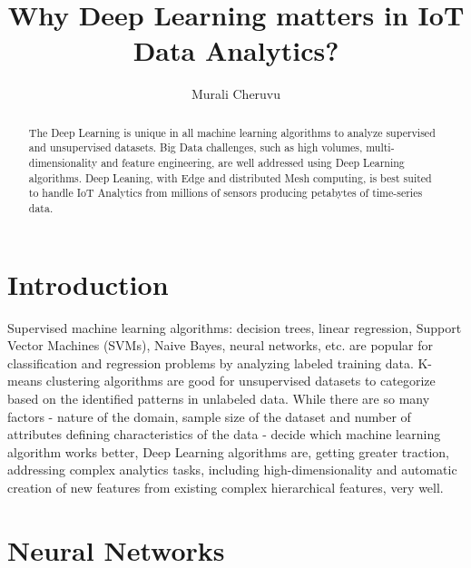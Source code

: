 \documentclass[sigconf]{acmart}
\begin{document}
	\title{Why Deep Learning matters in IoT Data Analytics?}
	
	
	\author{Murali Cheruvu}
	
	\renewcommand{\shortauthors}{M. Cheruvu}
	
	
	\begin{abstract}
		
	The Deep Learning is unique in all machine learning algorithms to analyze supervised and unsupervised datasets. Big Data challenges, such as high volumes, multi-dimensionality and feature engineering, are well addressed using Deep Learning algorithms. Deep Leaning, with Edge and distributed Mesh computing, is best suited to handle IoT Analytics from millions of sensors producing petabytes of time-series data.
			
	\end{abstract}
	
	
	\maketitle

	
	\section{Introduction}		

	Supervised machine learning algorithms: decision trees, linear regression, Support Vector Machines (SVMs), Naive Bayes, neural networks, etc. are popular for classification and regression problems by analyzing labeled training data. K-means clustering algorithms are good for unsupervised datasets to categorize based on the identified patterns in unlabeled data. While there are so many factors - nature of the domain, sample size of the dataset and number of attributes defining characteristics of the data - decide which machine learning algorithm works better, Deep Learning algorithms are, getting greater traction, addressing complex analytics tasks, including high-dimensionality and automatic creation of new features from existing complex hierarchical features, very well. 
		
	\section{Neural Networks}
\end{document}
